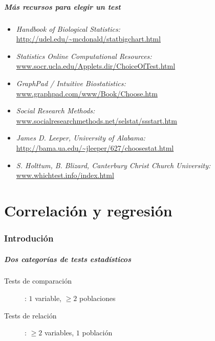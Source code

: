 \documentclass[mathserif]{beamer}
\begin{document}
\begin{frame}[label=chtest8]
   \frametitle{M\'as recursos para elegir un test}
   \hspace{-5cm}
   \small
    \begin{itemize}
      \item \emph{Handbook of Biological Statistics:} \\ \url{http://udel.edu/~mcdonald/statbigchart.html}
      \item \emph{Statistics Online Computational Resources:} \\ \url{www.socr.ucla.edu/Applets.dir/ChoiceOfTest.html}
      \item \emph{GraphPad / Intuitive Biostatistics:} \\ \url{www.graphpad.com/www/Book/Choose.htm}
      \item \emph{Social Research Methods:} \\ \url{www.socialresearchmethods.net/selstat/ssstart.htm}
      \item \emph{James D. Leeper, University of Alabama:} \\ \url{http://bama.ua.edu/~jleeper/627/choosestat.html}
      \item \emph{S. Holttum, B. Blizard, Canterbury Christ Church University:} \\ \url{www.whichtest.info/index.html}
   \end{itemize}
\end{frame}%






\part[Correlaci\'on y regresi\'on]{Correlaci\'on y regresi\'on}



\section{Introduci\'on}
 

\begin{frame}[label=regrcontext]
   \frametitle{Dos categor\'ias de tests estad\'isticos}
   \begin{description}
      \item[Tests de comparaci\'on]: $1$ variable, $\geq 2$ poblaciones
      \item[Tests de relaci\'on]: $\geq 2$ variables, $1$ poblaci\'on
   \end{description}
\end{frame}%
\end{document}

